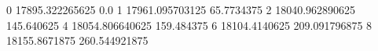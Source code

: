 0 17895.322265625 0.0
1 17961.095703125 65.7734375
2 18040.962890625 145.640625
4 18054.806640625 159.484375
6 18104.4140625 209.091796875
8 18155.8671875 260.544921875
